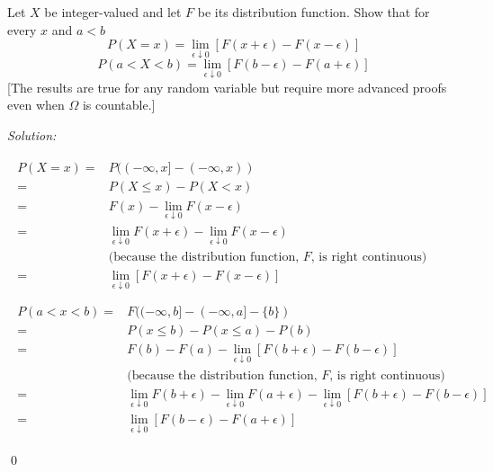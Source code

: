 \documentclass[12pt]{article}
\newenvironment{problem}[2][Problem]{\begin{trivlist}
\item[\hskip \labelsep {\bfseries #1}\hskip \labelsep {\bfseries #2.}]}{\end{trivlist}}
\newenvironment{sol}
    {\emph{Solution:}
    }
    {
    \qed
    }
\begin{document}
\begin{problem}{3}
Let $X$ be integer-valued and let $F$ be its distribution function. Show that for every $x$ and $a<b$
\[P(X=x)=\lim_{\epsilon\downarrow 0}[F(x+\epsilon)-F(x-\epsilon)]\]
\[P(a<X<b)=\lim_{\epsilon\downarrow 0}[F(b-\epsilon)-F(a+\epsilon)]\]
[The results are true for any random variable but require more advanced proofs even when $\Omega$ is countable.]
\end{problem}
\begin{sol}
\begin{gather*}
\begin{align*}
P(X=x)=&P((-\infty,x]-(-\infty,x))\\
=&P(X\leq x)-P(X<x)\\
=&F(x)-\lim_{\epsilon\downarrow0}F(x-\epsilon)\\
=&\lim_{\epsilon\downarrow0}F(x+\epsilon)-\lim_{\epsilon\downarrow0}F(x-\epsilon)\\
&\text{(because the distribution function, }F\text{, is right continuous)}\\
=&\lim_{\epsilon\downarrow0}[F(x+\epsilon)-F(x-\epsilon)]\\
\end{align*}\\
\begin{align*}
P(a<x<b)=&F((-\infty,b]-(-\infty,a]-\{b\})\\
=&P(x\leq b)-P(x\leq a)-P(b)\\
=&F(b)-F(a)-\lim_{\epsilon\downarrow0}[F(b+\epsilon)-F(b-\epsilon)]\\
&\text{(because the distribution function, }F\text{, is right continuous)}\\
=&\lim_{\epsilon\downarrow0}F(b+\epsilon)-\lim_{\epsilon\downarrow0}F(a+\epsilon)-\lim_{\epsilon\downarrow0}[F(b+\epsilon)-F(b-\epsilon)]\\
=&\lim_{\epsilon\downarrow 0}[F(b-\epsilon)-F(a+\epsilon)]
\end{align*}
\end{gather*}
\end{sol}



\end{document}
